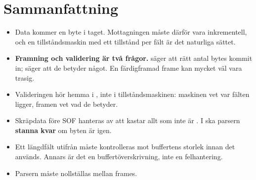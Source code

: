 \section*{Sammanfattning}

\begin{itemize}
  \item Data kommer en byte i taget. Mottagningen måste därför vara inkrementell, och en
    tillståndsmaskin med ett tillstånd per fält är det naturliga sättet.
  \item \textbf{Framning och validering är två frågor.}  säger att rätt antal
    bytes kommit in;  säger att de betyder något. En färdigframad frame kan
    mycket väl vara trasig.
  \item Valideringen hör hemma i , inte i tillståndsmaskinen:
    maskinen vet var fälten ligger, framen vet vad de betyder.
  \item Skräpdata före SOF hanteras av att  kastar allt som inte är .
    I  ska parsern \textbf{stanna kvar} om byten är  igen.
  \item Ett längdfält utifrån måste kontrolleras mot buffertens storlek innan det används. Annars
    är det en buffertöverskrivning, inte en felhantering.
  \item Parsern måste nollställas mellan frames.
\end{itemize}
